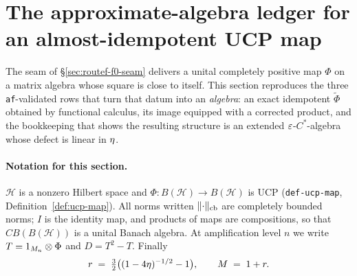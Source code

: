 \section{The approximate-algebra ledger for an almost-idempotent UCP map}\label{sec:routef-ai-ledger}

The seam of \S\ref{sec:routef-f0-seam} delivers a unital completely positive map
$\Phi$ on a matrix algebra whose square is close to itself. This section reproduces the
three \texttt{af}-validated rows that turn that datum into an \emph{algebra}: an exact
idempotent $\widetilde\Phi$ obtained by functional calculus, its image equipped with a
corrected product, and the bookkeeping that shows the resulting structure is an extended
$\varepsilon$-$C^{*}$-algebra whose defect is linear in $\eta$.

\paragraph{Notation for this section.} $\mathcal H$ is a nonzero Hilbert space and
$\Phi:B(\mathcal H)\to B(\mathcal H)$ is UCP (\texttt{def-ucp-map},
Definition~\ref{def:ucp-map}). All norms written $\lVert \cdot\rVert_{\mathrm{cb}}$ are completely
bounded norms; $I$ is the identity map, and products of maps are compositions, so that
$CB(B(\mathcal H))$ is a unital Banach algebra. At amplification level $n$ we write
$T=1_{M_{n}}\otimes\Phi$ and $D=T^{2}-T$. Finally
\begin{equation}\label{eq:ai-rM}
  r\;=\;\tfrac32\bigl((1-4\eta)^{-1/2}-1\bigr),
  \qquad M\;=\;1+r .
\end{equation}

